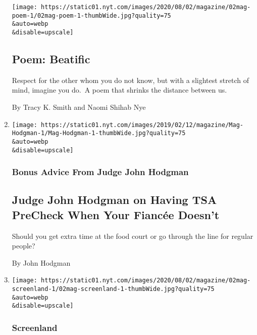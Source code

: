 \begin{enumerate}
  \texttt{[image: https://static01.nyt.com/images/2020/08/02/magazine/02mag-poem-1/02mag-poem-1-thumbWide.jpg?quality=75\\\&auto=webp\\\&disable=upscale]}

  \hypertarget{poem-beatific}{%
  \subsection{Poem: Beatific}\label{poem-beatific}}

  Respect for the other whom you do not know, but with a slightest
  stretch of mind, imagine you do.~A poem that shrinks the distance
  between us.

  By Tracy K. Smith and Naomi Shihab Nye
\item
  \href{/2020/07/30/magazine/judge-john-hodgman-on-having-tsa-precheck-when-your-fiancee-doesnt.html}{}

  \texttt{[image: https://static01.nyt.com/images/2019/02/12/magazine/Mag-Hodgman-1/Mag-Hodgman-1-thumbWide.jpg?quality=75\\\&auto=webp\\\&disable=upscale]}

  \hypertarget{bonus-advice-from-judge-john-hodgman}{%
  \subsubsection{Bonus Advice From Judge John
  Hodgman}\label{bonus-advice-from-judge-john-hodgman}}

  \hypertarget{judge-john-hodgman-on-having-tsa-precheck-when-your-fiancuxe9e-doesnt}{%
  \subsection{Judge John Hodgman on Having TSA PreCheck When Your
  Fiancée
  Doesn't}\label{judge-john-hodgman-on-having-tsa-precheck-when-your-fiancuxe9e-doesnt}}

  Should you get extra time at the food court or go through the line for
  regular people?

  By John Hodgman
\item
  \href{/2020/07/29/magazine/i-may-destroy-you-hbo-michaela-coel.html}{}

  \texttt{[image: https://static01.nyt.com/images/2020/08/02/magazine/02mag-screenland-1/02mag-screenland-1-thumbWide.jpg?quality=75\\\&auto=webp\\\&disable=upscale]}

  \hypertarget{screenland}{%
  \subsubsection{Screenland}\label{screenland}}


\end{enumerate}
